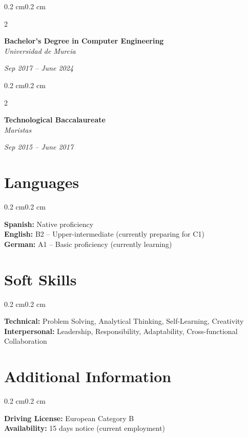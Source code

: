 \documentclass[10pt, letterpaper]{article}
\newenvironment{onecolentry}{
    \begin{adjustwidth}{0.2 cm}{0.2 cm}
}{
    \end{adjustwidth}
}
\newenvironment{twocolentry}[2][]{
    \onecolentry
    \def\secondColumn{#2}
    \setcolumnwidth{\fill, 4.5 cm}
    \begin{paracol}{2}
}{
    \switchcolumn \raggedleft \secondColumn
    \end{paracol}
    \endonecolentry
}
\begin{document}
    \begin{twocolentry}{\textit{Sep 2017 -- June 2024}}
        \textbf{Bachelor's Degree in Computer Engineering} \\
        \textit{Universidad de Murcia}
    \end{twocolentry}
    
    \begin{twocolentry}{\textit{Sep 2015 -- June 2017}}
        \textbf{Technological Baccalaureate} \\
        \textit{Maristas}
    \end{twocolentry}

    \section{Languages}
    \begin{onecolentry}
        \textbf{Spanish:} Native proficiency \\
        \textbf{English:} B2 – Upper-intermediate (currently preparing for C1) \\
        \textbf{German:} A1 – Basic proficiency (currently learning)
    \end{onecolentry}

    \section{Soft Skills}
    \begin{onecolentry}
        \textbf{Technical:} Problem Solving, Analytical Thinking, Self-Learning, Creativity \\
        \textbf{Interpersonal:} Leadership, Responsibility, Adaptability, Cross-functional Collaboration
    \end{onecolentry}

    \section{Additional Information}
    \begin{onecolentry}
        \textbf{Driving License:} European Category B \\
        \textbf{Availability:} 15 days notice (current employment)
    \end{onecolentry}
\end{document}
